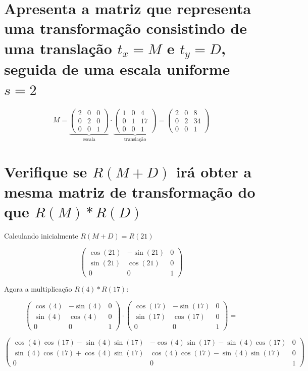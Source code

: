 \documentclass{article}
\begin{document}
\section{Apresenta a matriz que representa uma transformação consistindo de uma translação $t_x = M$ e $t_y = D$, seguida de uma escala uniforme $s = 2$}


$$M = \underbrace{
	\begin{pmatrix}
		2 & 0 & 0\\
		0 & 2 & 0\\
		0 & 0 & 1
	\end{pmatrix}
}_\text{escala}
\cdot
\underbrace{\begin{pmatrix}
		1 & 0 & 4\\
		0 & 1 & 17\\
		0 & 0 & 1
\end{pmatrix}}_\text{translação}
=
\begin{pmatrix}
	2 & 0 & 8\\
	0 & 2 & 34\\
	0 & 0 & 1
\end{pmatrix}
$$

\section{Verifique se $R(M+D)$ irá obter a mesma matriz de transformação do que $R(M)*R(D)$}

Calculando inicialmente $R(M + D) = R(21)$

$$\begin{pmatrix}
\cos{(21)} & -\sin{(21)} & 0\\
\sin{(21)} & \cos{(21)} & 0\\
0 & 0 & 1
\end{pmatrix}
$$

Agora a multiplicação $R(4) * R(17)$:

$$\begin{pmatrix}
	\cos{(4)} & -\sin{(4)} & 0\\
	\sin{(4)} & \cos{(4)} & 0\\
	0 & 0 & 1
\end{pmatrix} \cdot \begin{pmatrix}
\cos{(17)} & -\sin{(17)} & 0\\
\sin{(17)} & \cos{(17)} & 0\\
0 & 0 & 1
\end{pmatrix} =
$$

$$\begin{pmatrix}
	\cos{(4)} \cos{(17)} - \sin{(4)} \sin{(17)} & -\cos{(4)} \sin{(17)} - \sin{(4)} \cos{(17)} & 0\\
	\sin{(4)} \cos{(17)} + \cos{(4)} \sin{(17)} & \cos{(4)} \cos{(17)} - \sin{(4)} \sin{(17)} & 0\\
	0 & 0 & 1
\end{pmatrix}$$
\end{document}
